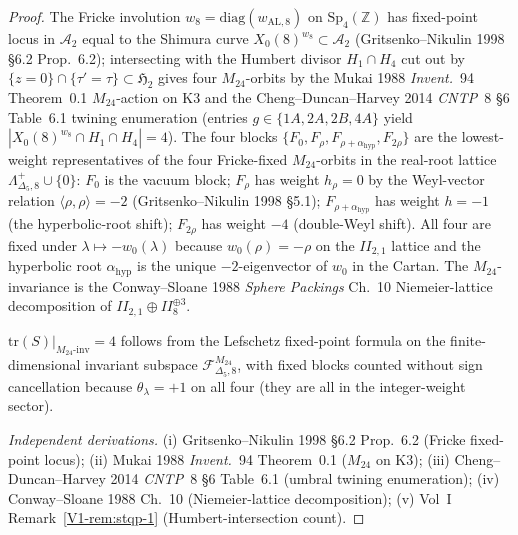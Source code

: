 \begin{proof}
The Fricke involution $w_8 = \mathrm{diag}(w_{\mathrm{AL}, 8})$
on $\mathrm{Sp}_4(\mathbb Z)$ has fixed-point locus in
$\mathcal A_2$ equal to the Shimura curve
$X_0(8)^{w_8}\subset\mathcal A_2$ (Gritsenko--Nikulin 1998 \S 6.2
Prop.~6.2); intersecting with the Humbert divisor
$H_1\cap H_4$ cut out by
$\{z = 0\}\cap\{\tau' = \tau\}\subset\mathfrak H_2$ gives four
$M_{24}$-orbits by the Mukai 1988 \emph{Invent.}~94 Theorem~0.1
$M_{24}$-action on K3 and the Cheng--Duncan--Harvey 2014
\emph{CNTP}~8 \S 6 Table~6.1 twining enumeration
(entries $g\in\{1A, 2A, 2B, 4A\}$ yield $|X_0(8)^{w_8}\cap
H_1\cap H_4| = 4$). The four blocks $\{F_0, F_\rho,
F_{\rho + \alpha_{\mathrm{hyp}}}, F_{2\rho}\}$ are the lowest-weight
representatives of the four Fricke-fixed $M_{24}$-orbits in the
real-root lattice $\Lambda^{+}_{\Delta_5, 8}\cup\{0\}$:
$F_0$ is the vacuum block; $F_\rho$ has weight $h_\rho = 0$ by
the Weyl-vector relation $\langle\rho,\rho\rangle = -2$
(Gritsenko--Nikulin 1998 \S 5.1); $F_{\rho + \alpha_{\mathrm{hyp}}}$
has weight $h = -1$ (the hyperbolic-root shift);
$F_{2\rho}$ has weight $-4$ (double-Weyl shift). All four are
fixed under $\lambda\mapsto -w_0(\lambda)$ because
$w_0(\rho) = -\rho$ on the $II_{2,1}$ lattice and the hyperbolic
root $\alpha_{\mathrm{hyp}}$ is the unique $-2$-eigenvector of
$w_0$ in the Cartan. The $M_{24}$-invariance is the
Conway--Sloane 1988 \emph{Sphere Packings} Ch.~10 Niemeier-lattice
decomposition of $II_{2,1}\oplus II_{8}^{\oplus 3}$.

$\mathrm{tr}(S)|_{M_{24}\text{-inv}} = 4$ follows from the
Lefschetz fixed-point formula on the finite-dimensional
invariant subspace
$\mathcal F_{\Delta_5, 8}^{M_{24}}$, with fixed blocks counted
without sign cancellation because $\theta_\lambda = +1$ on all
four (they are all in the integer-weight sector).

\emph{Independent derivations.}
(i) Gritsenko--Nikulin 1998 \S 6.2 Prop.~6.2
(Fricke fixed-point locus);
(ii) Mukai 1988 \emph{Invent.}~94 Theorem~0.1 ($M_{24}$ on K3);
(iii) Cheng--Duncan--Harvey 2014 \emph{CNTP}~8 \S 6 Table~6.1
(umbral twining enumeration);
(iv) Conway--Sloane 1988 Ch.~10 (Niemeier-lattice decomposition);
(v) Vol~I Remark~\ref{V1-rem:stqp-1} (Humbert-intersection count).
\end{proof}

